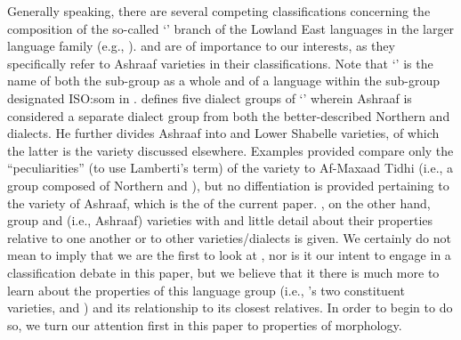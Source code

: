 \documentclass[output=paper]{LSP/langsci}
\begin{document}
 Generally speaking, there are several competing classifications concerning the composition of the so-called `' branch of the Lowland East  languages in the larger  language family (e.g., \citealt{Abdhullahi2000,EhretAli1984,Heine1978,Lamberti1984,Moreno1955}). \citet{Lamberti1984} and \citet{EhretAli1984} are of importance to our interests, as they specifically refer to Ashraaf varieties in their classifications. Note that `' is the name of both the sub-group as a whole and of a language within the sub-group designated ISO:som in \citet{Ethnologue19}. \citet{Lamberti1984} defines five dialect groups of `' wherein Ashraaf is considered a separate dialect group from both the better-described Northern and   dialects. He further divides Ashraaf into  and Lower Shabelle varieties, of which the latter is the  variety discussed elsewhere. Examples provided compare only the ``peculiarities'' (to use Lamberti's term) of the  variety to Af-Maxaad Tidhi (i.e., a group composed of Northern and  ), but no diffentiation is provided pertaining to the  variety of Ashraaf, which is the  of the current paper. \citet{EhretAli1984}, on the other hand, group  and  (i.e., Ashraaf) varieties with   and little detail about their properties relative to one another or to other varieties/dialects is given. We certainly do not mean to imply that we are the first to look at , nor is it our intent to engage in a classification debate in this paper, but we believe that it there is much more to learn about the properties of this language group (i.e., 's two constituent varieties,  and ) and its relationship to its closest relatives. In order to begin to do so, we turn our attention first in this paper to properties of  morphology.
 
 
\end{document}
